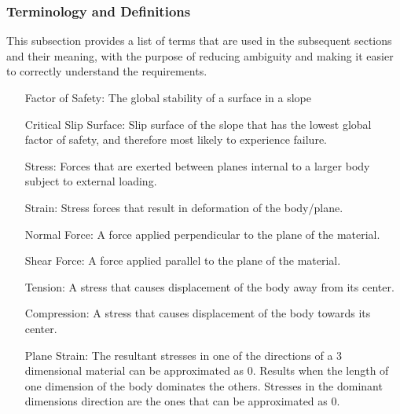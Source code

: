 \documentclass[12pt]{article}
\begin{document}
\subsubsection{Terminology and Definitions}
\label{Sec:TermDefs}
This subsection provides a list of terms that are used in the subsequent sections and their meaning, with the purpose of reducing ambiguity and making it easier to correctly understand the requirements.
\begin{itemize}
\item[Factor of Safety:]The global stability of a surface in a slope
\item[Critical Slip Surface:]Slip surface of the slope that has the lowest global factor of safety, and therefore most likely to experience failure.
\item[Stress:]Forces that are exerted between planes internal to a larger body subject to external loading.
\item[Strain:]Stress forces that result in deformation of the body/plane.
\item[Normal Force:]A force applied perpendicular to the plane of the material.
\item[Shear Force:]A force applied parallel to the plane of the material.
\item[Tension:]A stress that causes displacement of the body away from its center.
\item[Compression:]A stress that causes displacement of the body towards its center.
\item[Plane Strain:]The resultant stresses in one of the directions of a 3 dimensional material can be approximated as 0. Results when the length of one dimension of the body dominates the others. Stresses in the dominant dimensions direction are the ones that can be approximated as 0.
\end{itemize}
\end{document}
